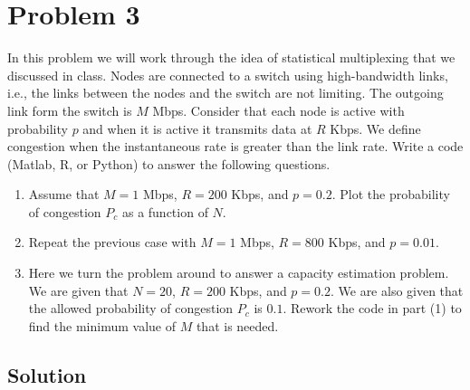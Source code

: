 
\section*{Problem 3}

In this problem we will work through the idea of statistical multiplexing that we discussed in class.
Nodes are connected to a switch using high-bandwidth links, i.e., the links between the nodes and the switch are not
limiting.
The outgoing link form the switch is $M$ Mbps.
Consider that each node is active with probability $p$ and when it is active it transmits data at $R$ Kbps.
We define congestion when the instantaneous rate is greater than the link rate.
Write a code (Matlab, R, or Python) to answer the following questions.

\begin{enumerate}
      \item Assume that $M = 1$ Mbps, $R = 200$ Kbps, and $p = 0.2$.
            Plot the probability of congestion $P_c$ as a
            function of $N$.
      \item Repeat the previous case with $M = 1$ Mbps, $R = 800$ Kbps, and $p = 0.01$.
      \item Here we turn the problem around to answer a capacity estimation problem.
            We are given that $N = 20$,
            $R = 200$ Kbps, and $p = 0.2$.
            We are also given that the allowed probability of congestion $P_c$ is $0.1$.
            Rework the code in part (1) to find the minimum value of $M$ that is needed.
\end{enumerate}

\subsection*{Solution}
